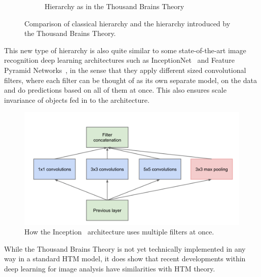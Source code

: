 \begin{figure}[H]
\begin{subfigure}[t]{0.3\textwidth}
        \caption{Hierarchy as in the Thousand Brains Theory}
        \label{}
    \end{subfigure}
    \caption[Thousand Brains Visualization]{Comparison of classical hierarchy and the hierarchy introduced by the Thousand Brains Theory.}
\end{figure}
This new type of hierarchy is also quite similar to some state-of-the-art image recognition deep learning architectures such as InceptionNet~\cite{inceptionnet} and Feature Pyramid Networks~\cite{fpn}, in the sense that they apply different sized convolutional filters, where each filter can be thought of as its own separate model, on the data and do predictions based on all of them at once. This also ensures scale invariance of objects fed in to the architecture.
\begin{figure}[H]
    \centering
    \includegraphics[width=\linewidth]{resources/models/inception_module.png}
    \caption[Filter Concatenation]{How the Inception~\cite{inceptionnet} architecture uses multiple filters at once.}
    \label{fig:inception_module}
\end{figure}

While the Thousand Brains Theory is not yet technically implemented in any way in a standard HTM model, it does show that recent developments within deep learning for image analysis have similarities with HTM theory.


